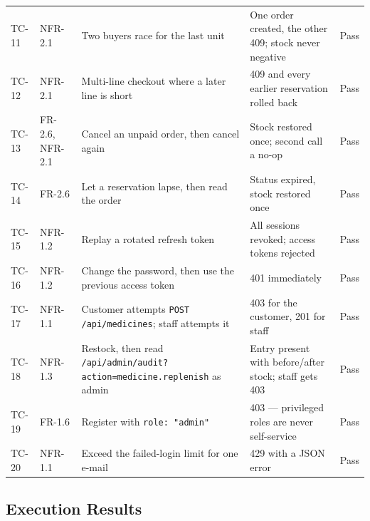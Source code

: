 \documentclass[11pt,a4paper]{article}
\begin{document}
{\begin{longtable}{@{}L{1.55cm}L{2.30cm}L{4.23cm}L{5.00cm}L{1.80cm}@{}}
TC-11 & NFR-2.1 & Two buyers race for the last unit & One order created, the other 409; stock never negative & Pass\\
TC-12 & NFR-2.1 & Multi-line checkout where a later line is short & 409 and every earlier reservation rolled back & Pass\\
TC-13 & FR-2.6, NFR-2.1 & Cancel an unpaid order, then cancel again & Stock restored once; second call a no-op & Pass\\
TC-14 & FR-2.6 & Let a reservation lapse, then read the order & Status expired, stock restored once & Pass\\
TC-15 & NFR-1.2 & Replay a rotated refresh token & All sessions revoked; access tokens rejected & Pass\\
TC-16 & NFR-1.2 & Change the password, then use the previous access token & 401 immediately & Pass\\
TC-17 & NFR-1.1 & Customer attempts \texttt{POST /api/medicines}; staff attempts it & 403 for the customer, 201 for staff & Pass\\
TC-18 & NFR-1.3 & Restock, then read \texttt{/api/admin/audit?action=medicine.replenish} as admin & Entry present with before/after stock; staff gets 403 & Pass\\
TC-19 & FR-1.6 & Register with \texttt{role: "admin"} & 403 --- privileged roles are never self-service & Pass\\
TC-20 & NFR-1.1 & Exceed the failed-login limit for one e-mail & 429 with a JSON error & Pass\\
\end{longtable}
}

\subsection{Execution Results}
\end{document}
